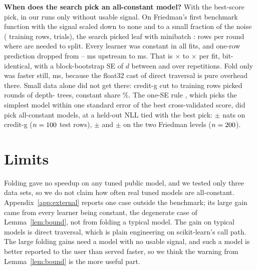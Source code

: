 \documentclass{article}
\begin{document}
\textbf{When does the search pick an all-constant model?} With the best-score pick, in our runs only without usable signal. On Friedman's first benchmark function \citep{friedman1991mars} with the signal scaled down to none and to a small fraction of the noise (\nLowTrainRows{} training rows, \nLowTrials{} trials), the search picked leaf \nLowPickLeaf{} with minibatch \nLowPickMinibatch: \nLowBatchRows{} rows per round where \nLowMinRows{} are needed to split. Every learner was constant in all \nLowFits{} fits, and one-row prediction dropped from \nLowPristineMinMs--\nLowPristineMaxMs{} ms upstream to \nLowOursMs{} ms. That is \nLowMinX$\times$ to \nLowMaxX$\times$ per fit, bit-identical, with a block-bootstrap SE of $d$ between \nLowSEMin{} and \nLowSEMax{} over \nLowReps{} repetitions. Fold only was faster still, \nLowFoldMs{} ms, because the float32 cast of direct traversal is pure overhead there. Small data alone did not get there: credit-g cut to \nSmallTrainRows{} training rows picked \nSmallPickRounds{} rounds of depth-\nSmallPickDepth{} trees, constant share \nSmallShareMax\%. The one-SE rule \citep{breiman1984cart}, which picks the simplest model within one standard error of the best cross-validated score, did pick all-constant models, at a held-out NLL tied with the best pick: \nOneSECGDiff{} $\pm$ \nOneSECGSE{} nats on credit-g ($n = 100$ test rows), \nOneSEFADiff{} $\pm$ \nOneSEFASE{} and \nOneSEFBDiff{} $\pm$ \nOneSEFBSE{} on the two Friedman levels ($n = 200$).

\section{Limits}
\label{sec:limits}

Folding gave no speedup on any tuned public model, and we tested only three data sets, so we do not claim how often real tuned models are all-constant. Appendix~\ref{app:external} reports one case outside the benchmark; its large gain came from every learner being constant, the degenerate case of Lemma~\ref{lem:bound}, not from folding a typical model. The gain on typical models is direct traversal, which is plain engineering on scikit-learn's call path. The large folding gains need a model with no usable signal, and such a model is better reported to the user than served faster, so we think the warning from Lemma~\ref{lem:bound} is the more useful part.
\end{document}

